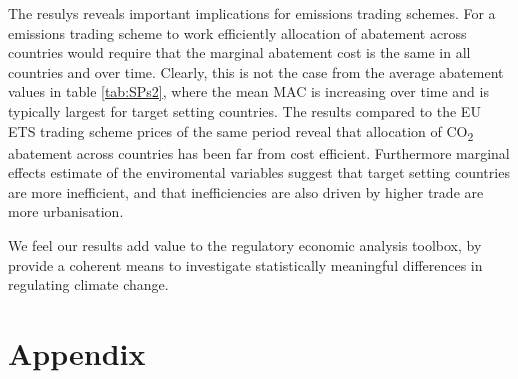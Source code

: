 \documentclass[
  12pt,
]{article}
\begin{document}
The resulys reveals important implications for emissions trading schemes. For a emissions trading scheme to work efficiently allocation of abatement across countries would require that the marginal abatement cost is the same in all countries and over time. Clearly, this is not the case from the average abatement values in table \ref{tab:SPs2}, where the mean MAC is increasing over time and is typically largest for target setting countries. The results compared to the EU ETS trading scheme prices of the same period reveal that allocation of CO\textsubscript{2} abatement across countries has been far from cost efficient.
Furthermore marginal effects estimate of the enviromental variables suggest that target setting countries are more inefficient, and that inefficiencies are also driven by higher trade are more urbanisation.

We feel our results add value to the regulatory economic analysis toolbox, by provide a coherent means to investigate statistically meaningful differences in regulating climate change.

\hypertarget{appendix}{%
\section{Appendix}\label{appendix}}

\begingroup\fontsize{10}{12}\selectfont
\end{document}
